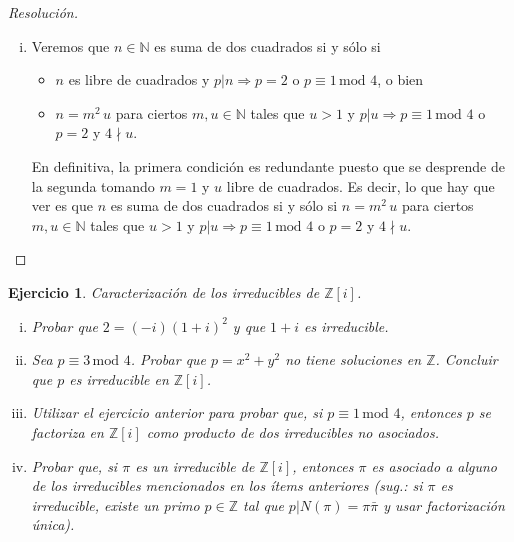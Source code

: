\documentclass[a4paper,11pt]{article}
\newcommand{\Zm}[1]{\ensuremath{\mathbb{Z}[#1]}}
\newcommand{\Cong}[3]{\ensuremath{#1 \equiv #2 \, \textrm{mod } #3}}
\newcommand{\Div}[2]{\ensuremath{#1 | #2}}
\newtheorem*{ej}{Ejercicio}
\begin{document}
\begin{proof}[Resoluci\'on]
\begin{enumerate}[i.]
\item Veremos que $n \in \mathbb{N}$ es suma de dos cuadrados si y sólo si
\begin{itemize}
    \item $n$ es libre de cuadrados y $\Div{p}{n} \Rightarrow p = 2$ o \Cong{p}{1}{4}, o bien
    \item $n = m^2 \, u$ para ciertos $m, u \in \mathbb{N}$ tales que 
    $u > 1$ y $\Div{p}{u} \Rightarrow \Cong{p}{1}{4}$ o $p = 2$ y $4 \nmid u$.
\end{itemize}

En definitiva, la primera condición es redundante puesto que se desprende de la 
segunda tomando $m = 1$ y $u$ libre de cuadrados. Es decir, lo que hay que ver es que
$n$ es suma de dos cuadrados si y sólo si $n = m^2 \, u$ para ciertos $m, u \in \mathbb{N}$ tales que 
    $u > 1$ y $\Div{p}{u} \Rightarrow \Cong{p}{1}{4}$ o $p = 2$ y $4 \nmid u$.

\end{enumerate}

\end{proof}


\begin{ej} 
Caracterización de los irreducibles de \Zm{i}.

\begin{enumerate}[i.]
    \item  Probar que $2 = (-i)(1+i)^2$ y que $1+i$ es irreducible.

    \item Sea \Cong{p}{3}{4}. Probar que $p = x^2 + y^2$ no tiene soluciones
    en $\mathbb{Z}$. Concluir que $p$ es irreducible en \Zm{i}.

    \item Utilizar el ejercicio anterior para probar que, si \Cong{p}{1}{4}, entonces
    $p$ se factoriza en \Zm{i} como producto de dos irreducibles no asociados.

    \item Probar que, si $\pi$ es un irreducible de \Zm{i}, entonces $\pi$ es asociado
    a alguno de los irreducibles mencionados en los ítems anteriores (sug.: si $\pi$ es
    irreducible, existe un primo $p \in \mathbb{Z}$ tal que \Div{p}{N(\pi) = \pi \bar{\pi}}
    y usar factorización única).
\end{enumerate}
\end{ej}
\end{document}
